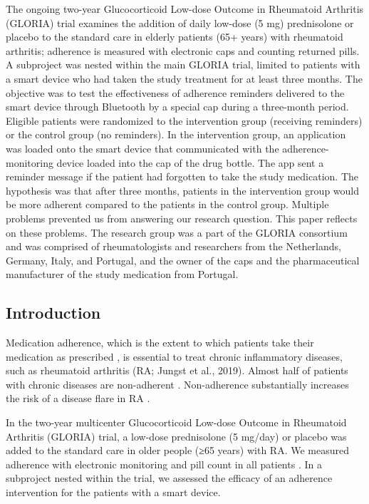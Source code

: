 \documentclass{article}
\begin{document}
The ongoing two-year Glucocorticoid Low-dose Outcome in Rheumatoid Arthritis (GLORIA) trial examines the addition of daily low-dose (5 mg) prednisolone or placebo to the standard care in elderly patients (65+ years) with rheumatoid arthritis; adherence is measured with electronic caps and counting returned pills. A subproject was nested within the main GLORIA trial, limited to patients with a smart device who had taken the study treatment for at least three months. The objective was to test the effectiveness of adherence reminders delivered to the smart device through Bluetooth by a special cap during a three-month period. Eligible patients were randomized to the intervention group (receiving reminders) or the control group (no reminders). In the intervention group, an application was loaded onto the smart device that communicated with the adherence-monitoring device loaded into the cap of the drug bottle. The app sent a reminder message if the patient had forgotten to take the study medication. The hypothesis was that after three months, patients in the intervention group would be more adherent compared to the patients in the control group. Multiple problems prevented us from answering our research question. This paper reflects on these problems. The research group was a part of the GLORIA consortium and was comprised of rheumatologists and researchers from the Netherlands, Germany, Italy, and Portugal, and the owner of the caps and the pharmaceutical manufacturer of the study medication from Portugal.



\subsection{Introduction}

Medication adherence, which is the extent to which patients take their medication as prescribed \parencite{Brown2011}, is essential to treat chronic inflammatory diseases, such as rheumatoid arthritis (RA; Jungst et al., 2019). Almost half of patients with chronic diseases are non-adherent \parencite{Jungst2019}\parencite{Kini2018}. Non-adherence substantially increases the risk of a disease flare in RA \parencite{Jungst2019}. 



In the two-year multicenter Glucocorticoid Low-dose Outcome in Rheumatoid Arthritis (GLORIA) trial, a low-dose prednisolone (5 mg/day) or placebo was added to the standard care in older people (≥65 years) with RA. We measured adherence with electronic monitoring and pill count in all patients \parencite{Hartman2021}. In a subproject nested within the trial, we assessed the efficacy of an adherence intervention for the patients with a smart device. 
\end{document}
